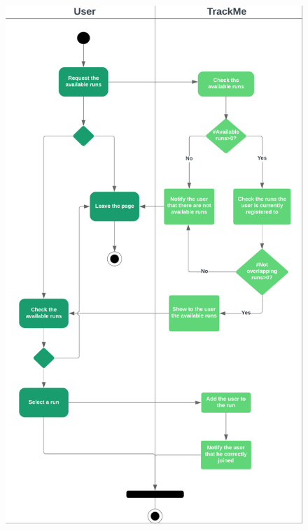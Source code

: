 \documentclass{article}
\begin{document}
\begin{legal}
\begin{legal}
\begin{legal}
\begin{figure}[H]
  				\includegraphics[width=145mm]{./images/Join-a-run-activity-diag.png}
				\end{figure}
    		\end{legal}
			

\end{legal}
\end{legal}
\end{document}
